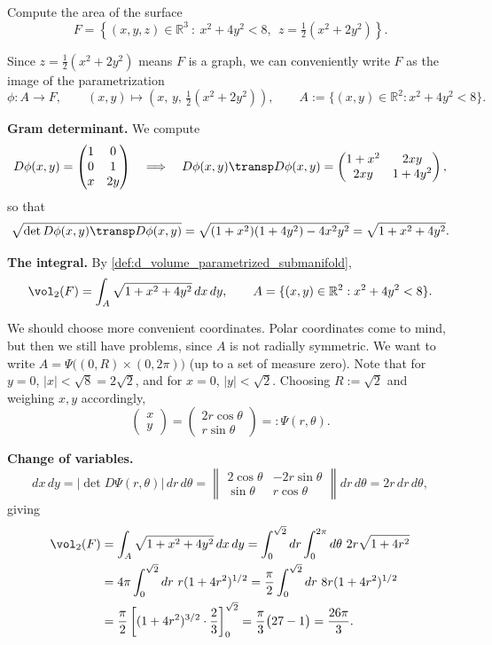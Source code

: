 \begin{example}
\label{ex:paraboloid_patch_area}
Compute the area of the surface
\[F = \left\{(x,y,z)\in\mathbb{R}^3 \ :\ x^2+4y^2 < 8,\ \ z = \tfrac12(x^2+2y^2)\right\}.\]

Since $z = \tfrac12(x^2+2y^2)$ means $F$ is a graph, we can conveniently write $F$ as the
image of the parametrization
\[\phi : A \to F, \qquad (x,y) \mapsto \left(x,\,y,\,\tfrac12(x^2+2y^2)\right),
  \qquad A := \{(x,y)\in\mathbb{R}^2 : x^2+4y^2 < 8\}.\]

\textbf{Gram determinant.} We compute
\[D\phi(x,y) = \begin{pmatrix} 1 & 0 \\ 0 & 1 \\ x & 2y \end{pmatrix}
  \quad \Longrightarrow \quad
  D\phi(x,y)\transp D\phi(x,y) = \begin{pmatrix} 1+x^2 & 2xy \\ 2xy & 1+4y^2 \end{pmatrix},\]
so that
\[\sqrt{\det D\phi(x,y)\transp D\phi(x,y)}
  = \sqrt{(1+x^2)(1+4y^2) - 4x^2y^2}
  = \sqrt{1+x^2+4y^2}.\]

\textbf{The integral.} By \cref{def:d_volume_parametrized_submanifold},
\[\vol_2(F) = \int_A \sqrt{1+x^2+4y^2}\,dx\,dy, \qquad A = \{(x,y)\in\mathbb{R}^2 :
x^2+4y^2<8\}.\]

We should choose more convenient coordinates. Polar coordinates come to mind, but then we
still have problems, since $A$ is not radially symmetric. We want to write
$A = \Psi\big((0,R)\times(0,2\pi)\big)$ (up to a set of measure zero). Note that for $y=0$,
$|x| < \sqrt8 = 2\sqrt2$, and for $x=0$, $|y| < \sqrt2$. Choosing $R := \sqrt2$ and weighing
$x,y$ accordingly,
\[\begin{pmatrix} x \\ y \end{pmatrix} = \begin{pmatrix} 2r\cos\theta \\ r\sin\theta
\end{pmatrix} =: \Psi(r,\theta).\]

\textbf{Change of variables.}
\[dx\,dy = |\det D\Psi(r,\theta)|\,dr\,d\theta
  = \left\lVert \begin{matrix} 2\cos\theta & -2r\sin\theta \\ \sin\theta & r\cos\theta
    \end{matrix}\right\rVert dr\,d\theta = 2r\,dr\,d\theta,\]
giving
\[
\begin{aligned}
\vol_2(F) &= \int_A \sqrt{1+x^2+4y^2}\,dx\,dy
  = \int_0^{\sqrt2} dr\int_0^{2\pi} d\theta\ 2r\sqrt{1+4r^2} \\
  &= 4\pi\int_0^{\sqrt2} dr\ r(1+4r^2)^{1/2}
   = \frac\pi2\int_0^{\sqrt2} dr\ 8r(1+4r^2)^{1/2} \\
  &= \frac\pi2\left[(1+4r^2)^{3/2}\cdot\frac23\right]_0^{\sqrt2}
   = \frac\pi3\big(27-1\big) = \frac{26\pi}{3}.
\end{aligned}
\]
\end{example}

